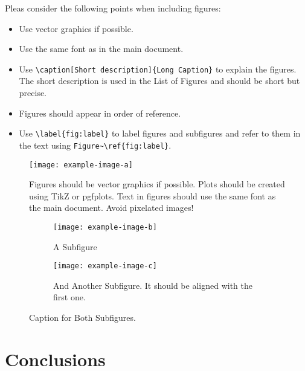 \documentclass[english,algorithms,reviews,examples,MA]{amsthesis}
\begin{document}
    Pleas consider the following points when including figures:
    \begin{itemize} 
        \item Use vector graphics if possible.
        \item Use the same font as in the main document.
        \item Use \verb|\caption[Short description]{Long Caption}| to explain the figures. The short description is used in the List of Figures and should be short but precise.
        \item Figures should appear in order of reference.
        \item Use \verb|\label{fig:label}| to label figures and subfigures and refer to them in the text using \verb|Figure~\ref{fig:label}|.
    \end{itemize}

    \begin{figure}[h]
        \texttt{[image: example-image-a]}
        \caption[A short description for the List of Figures.]{Figures should be vector graphics if possible. Plots should be created using TikZ or pgfplots. Text in figures should use the same font as the main document. Avoid pixelated images!}
        \label{fig:exampleA}
    \end{figure}


    \begin{figure}
        \begin{subfigure}{0.5\textwidth}
            \centering
            \texttt{[image: example-image-b]}
            \caption{A Subfigure}
            \label{fig:exampleB:1}
        \end{subfigure}
        \begin{subfigure}{0.5\textwidth}
            \centering
            \texttt{[image: example-image-c]}
            \caption{And Another Subfigure. It should be aligned with the first one.}
            \label{fig:exampleB:2}
        \end{subfigure}
        \caption{Caption for Both Subfigures.}        
        \label{fig:exampleB}
    \end{figure}
    \lipsum[11-14]   

    \chapter{Conclusions}
    \lipsum[95-99]    

\end{document}
